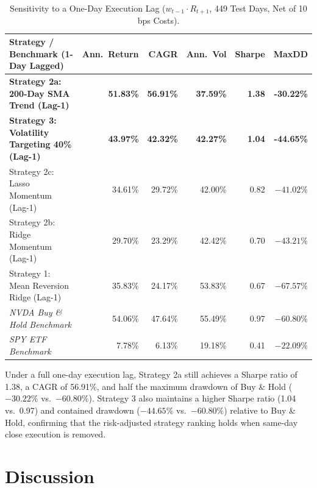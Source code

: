 \documentclass[11pt, a4paper]{article}
\begin{document}
\begin{table}[H]
\centering
\footnotesize
\setlength{\tabcolsep}{3.5pt}
\caption{Sensitivity to a One-Day Execution Lag ($w_{t-1} \cdot R_{t+1}$, 449 Test Days, Net of 10 bps Costs).}
\label{tab:lag_audit}
\begin{tabularx}{\textwidth}{l R R R R R}
\toprule
\textbf{Strategy / Benchmark (1-Day Lagged)} & \textbf{Ann.\ Return} & \textbf{CAGR} & \textbf{Ann.\ Vol} & \textbf{Sharpe} & \textbf{MaxDD} \\
\midrule
\textbf{Strategy 2a: 200-Day SMA Trend (Lag-1)} & \textbf{51.83\%} & \textbf{56.91\%} & \textbf{37.59\%} & \textbf{1.38} & \textbf{-30.22\%} \\
\textbf{Strategy 3: Volatility Targeting 40\% (Lag-1)} & \textbf{43.97\%} & \textbf{42.32\%} & \textbf{42.27\%} & \textbf{1.04} & \textbf{-44.65\%} \\
Strategy 2c: Lasso Momentum (Lag-1) & 34.61\% & 29.72\% & 42.00\% & 0.82 & $-41.02\%$ \\
Strategy 2b: Ridge Momentum (Lag-1) & 29.70\% & 23.29\% & 42.42\% & 0.70 & $-43.21\%$ \\
Strategy 1: Mean Reversion Ridge (Lag-1) & 35.83\% & 24.17\% & 53.83\% & 0.67 & $-67.57\%$ \\
\midrule
\textit{NVDA Buy \& Hold Benchmark} & 54.06\% & 47.64\% & 55.49\% & 0.97 & $-60.80\%$ \\
\textit{SPY ETF Benchmark} & 7.78\% & 6.13\% & 19.18\% & 0.41 & $-22.09\%$ \\
\bottomrule
\end{tabularx}
\end{table}

Under a full one-day execution lag, Strategy 2a still achieves a Sharpe ratio of 1.38, a CAGR of 56.91\%, and half the maximum drawdown of Buy \& Hold ($-30.22\%$ vs.\ $-60.80\%$). Strategy 3 also maintains a higher Sharpe ratio (1.04 vs.\ 0.97) and contained drawdown ($-44.65\%$ vs.\ $-60.80\%$) relative to Buy \& Hold, confirming that the risk-adjusted strategy ranking holds when same-day close execution is removed.

\section{Discussion}
\label{sec:discussion}
\end{document}
